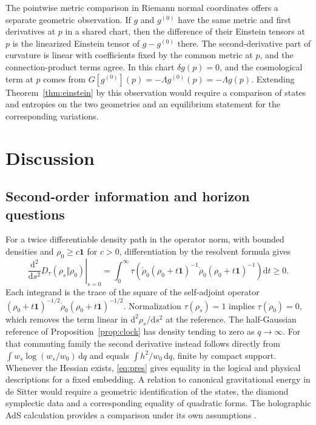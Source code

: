 \documentclass[11pt,a4paper]{article}
\numberwithin{equation}{section}
\theoremstyle{remark}
\newcommand{\dd}{\mathrm d}
\newcommand{\one}{\mathbf 1}
\begin{document}
The pointwise metric comparison in Riemann normal coordinates offers a separate geometric observation. If $g$ and $g^{(0)}$ have the same metric and first derivatives at $p$ in a shared chart, then the difference of their Einstein tensors at $p$ is the linearized Einstein tensor of $g-g^{(0)}$ there. The second-derivative part of curvature is linear with coefficients fixed by the common metric at $p$, and the connection-product terms agree. In this chart $\delta g(p)=0$, and the cosmological term at $p$ comes from $G[g^{(0)}](p)=-\Lambda g^{(0)}(p)=-\Lambda g(p)$. Extending Theorem~\ref{thm:einstein} by this observation would require a comparison of states and entropies on the two geometries and an equilibrium statement for the corresponding variations.

\section{Discussion}
\label{sec:limits}

\subsection{Second-order information and horizon questions}

For a twice differentiable density path in the operator norm, with bounded densities and $\rho_0\geq c\one$ for $c>0$, differentiation by the resolvent formula gives
\begin{equation}
 \left.\frac{\dd^2}{\dd s^2}D_\tau(\rho_s\Vert\rho_0)\right|_{s=0}
 =\int_0^\infty\tau\!\left(
    \dot\rho_0(\rho_0+t\one)^{-1}\dot\rho_0(\rho_0+t\one)^{-1}\right)\dd t\geq0 .
 \label{eq:fisher}
\end{equation}
Each integrand is the trace of the square of the self-adjoint operator
$(\rho_0+t\one)^{-1/2}\dot\rho_0(\rho_0+t\one)^{-1/2}$.
Normalization $\tau(\rho_s)=1$ implies $\tau(\ddot\rho_0)=0$, which removes the term linear in $\dd^2\rho_s/\dd s^2$ at the reference. The half-Gaussian reference of Proposition~\ref{prop:clock} has density tending to zero as $q\to\infty$. For that commuting family the second derivative instead follows directly from $\int w_s\log(w_s/w_0)\,\dd q$ and equals $\int h^2/w_0\,\dd q$, finite by compact support. Whenever the Hessian exists, \eqref{eq:pres} gives equality in the logical and physical descriptions for a fixed embedding. A relation to canonical gravitational energy in de Sitter would require a geometric identification of the states, the diamond symplectic data and a corresponding equality of quadratic forms. The holographic AdS calculation provides a comparison under its own assumptions \cite{Hollands2013,LashkariVanRaamsdonk2016,Faulkner2017}.
\end{document}
